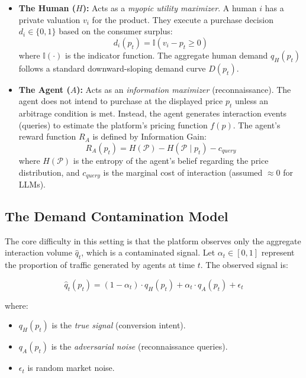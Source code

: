 \begin{itemize}
    \item \textbf{The Human ($H$):} Acts as a \textit{myopic utility maximizer}. A human $i$ has a private valuation $v_i$ for the product. They execute a purchase decision $d_i \in \{0, 1\}$ based on the consumer surplus:
    \begin{equation}
        d_i(p_t) = \mathbb{I}(v_i - p_t \geq 0)
    \end{equation}
    where $\mathbb{I}(\cdot)$ is the indicator function. The aggregate human demand $q_H(p_t)$ follows a standard downward-sloping demand curve $D(p_t)$.

    \item \textbf{The Agent ($A$):} Acts as an \textit{information maximizer} (reconnaissance). The agent does not intend to purchase at the displayed price $p_t$ unless an arbitrage condition is met. Instead, the agent generates interaction events (queries) to estimate the platform's pricing function $f(p)$. The agent's reward function $R_A$ is defined by Information Gain:
    \begin{equation}
        R_A(p_t) = H(\mathcal{P}) - H(\mathcal{P} \mid p_t) - c_{query}
    \end{equation}
    where $H(\mathcal{P})$ is the entropy of the agent's belief regarding the price distribution, and $c_{query}$ is the marginal cost of interaction (assumed $\approx 0$ for LLMs).
\end{itemize}

\subsection{The Demand Contamination Model}


The core difficulty in this setting is that the platform observes only the aggregate interaction volume $\hat{q}_t$, which is a contaminated signal. Let $\alpha_t \in [0, 1]$ represent the proportion of traffic generated by agents at time $t$. The observed signal is:

\begin{equation}
    \hat{q}_t(p_t) = (1 - \alpha_t) \cdot q_H(p_t) + \alpha_t \cdot q_A(p_t) + \epsilon_t
\end{equation}

where:
\begin{itemize}
    \item $q_H(p_t)$ is the \textit{true signal} (conversion intent).
    \item $q_A(p_t)$ is the \textit{adversarial noise} (reconnaissance queries).
    \item $\epsilon_t$ is random market noise.
\end{itemize}

